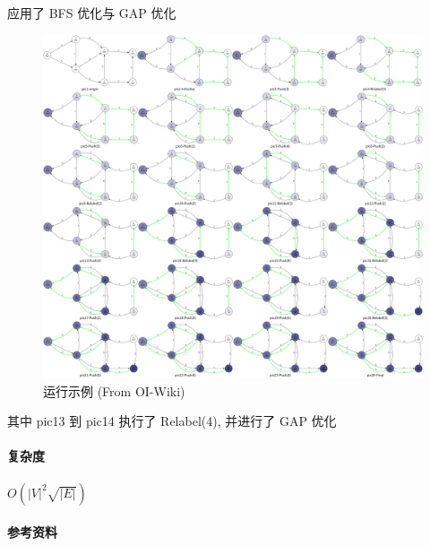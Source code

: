 应用了 BFS 优化与 GAP 优化

\begin{figure}[h]
    \label{img:hlpp}
    \centering
    \includegraphics[width=\textwidth]{img/hlpp.png}
    \caption{运行示例 (From OI-Wiki)}
\end{figure}

其中 pic13 到 pic14 执行了 Relabel(4), 并进行了 GAP 优化

\paragraph{复杂度} \(O\left(|V|^2\sqrt{|E|}\right)\)

\paragraph{参考资料} \cite{oiwiki} \cite{ahuja1997computational}
